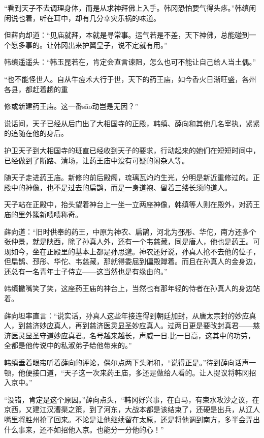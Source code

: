 “看到天子不去调理身体，而是从求神拜佛上入手。韩冈恐怕要气得头疼。”韩缜闲闲说也着，听在耳中，却有几分幸灾乐祸的味道。

但薛向却道：“见庙就拜，本就是寻常事。运气若是不差，天下神佛，总能碰到一个愿多事的。让韩冈出来护翼皇子，说不定就有用。”

韩缜遥遥头：“韩玉昆若在，肯定会直言谏阻，怎么也可不能让自己给人当土偶。”

“也不能怪世人。自从牛痘术大行于世，天下的药王庙，如今香火日渐旺盛，各州各县，都赶着趟的重

修或新建药王庙。这一番sāo动岂是无因？”

说话间，天子已经从后门出了大相国寺的正殿，韩缜、薛向和其他几名宰执，紧紧的追随在他的身后。

护卫天子到大相国寺的班直已经收到天子的要求，行动起来的她们在短短时间中，已经做到了断路、清场，让药王庙中没有可疑的闲杂人等。

随天子走进药王庙。新修的前后殿阁，琉璃瓦灼灼生光，分明是新近重修过的。正殿中的神像，也不是过去的扁鹊，而是一身道袍、留着三缕长须的道人。

天子站在正殿中，抬头望着神台上一坐一立两座神像，韩缜等人则在殿外，对药王庙的里外簇新啧啧称奇。

薛向道：“旧时供奉的药王，中原为神农、扁鹊，河北为邳彤、华佗，南方还多个张仲景，就是陕西，除了孙真人外，还有一个韦慈藏，同是唐人，他也是药王。可现如今，坐在正殿里的基本上都是孙思邈。神农还好说，孙真人抢不去他的位子，但扁鹊、邳彤、华佗、韦慈藏，那就得委屈到偏殿蹲着。而且在孙真人的金身边，还总有一名青年士子侍立——这当然也是有缘由的。”

韩缜撇嘴笑了笑，这座药王庙的神台上，当然也有那年轻的侍者在孙真人的身边站着。

薛向坦率直言：“说实话，孙真人这些年接连得到朝廷加封，从唐太宗封的妙应真人，到慈济妙应真人，再到慈济医灵显圣妙应真人。过两日更是要改封真君——慈济医灵显圣守道妙应真君。名号越来越长，声威一日.比一日高，这其中的功劳，全都是他传说中的私淑弟子给他带来的。”

韩缜垂着眼帘听着薛向的评论，偶尔点两下头附和，“说得正是。”待到薛向话声一顿，他便接口道，“天子这一次来药王庙，多还是做给人看的。让人提议将韩冈招入京中。”

“没错，肯定是这个原因。”薛向点头，“韩冈好兴事，在白马，有束水攻沙之议，在京西，又建江汉漕渠之策，到了河东，大战本都是该结束了，还硬是出兵，从辽人嘴里将胜州抢了回来。不论是让他继续留在太原，还是将他调到南方，多半会弄出什么事来，还不如招他入京。也能分一分他的心！”